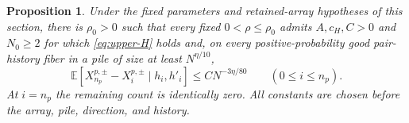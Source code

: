 \documentclass[11pt]{article}
\numberwithin{equation}{section}
\newtheorem{proposition}[theorem]{Proposition}
\theoremstyle{definition}
\theoremstyle{remark}
\newcommand{\E}{\mathbb E}
\newcommand{\1}{\mathbf 1}
\begin{document}
\begin{proposition}%
\label{prop:upper-conditional}
Under the fixed parameters and retained-array hypotheses of this
section, there is $\rho_0>0$ such that every fixed
$0<\rho\le\rho_0$ admits $A,c_H,C>0$ and $N_0\ge2$ for which
\eqref{eq:upper-H} holds and, on every positive-probability good
pair-history fiber in a pile of size at least $N^{\eta/10}$,
\begin{equation}\label{eq:upper-conditional}
 \E[X_{n_p}^{p,\pm}-X_i^{p,\pm}\mid h_i,h'_i]
                          \le CN^{-3\eta/80}
                         \qquad(0\le i\le n_p).
\end{equation}
At $i=n_p$ the remaining count is identically zero. All constants
are chosen before the array, pile, direction, and history.
\end{proposition}
\end{document}
